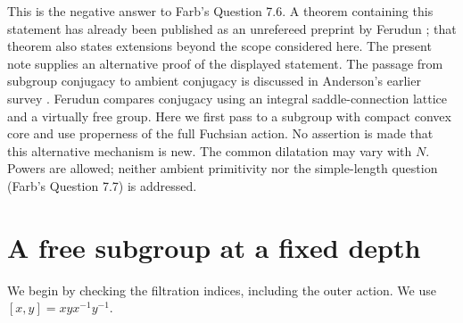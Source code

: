 \documentclass[11pt]{article}
\theoremstyle{remark}\newtheorem*{remark}{Remark}
\begin{document}
This is the negative answer to Farb's Question 7.6. A theorem containing
this statement has already been published as an unrefereed preprint by
Ferudun \cite[Theorem 1.1]{Ferudun}; that theorem also states extensions
beyond the scope considered here. The present note supplies an alternative
proof of the displayed statement. The passage from subgroup conjugacy to
ambient conjugacy is discussed in Anderson's earlier survey
\cite[\S5, author-hosted version]{Anderson}. Ferudun compares conjugacy using an
integral saddle-connection lattice and a virtually free group. Here we
first pass to a subgroup with compact convex core and use properness of
the full Fuchsian action. No assertion is made that this alternative
mechanism is new. The common dilatation may vary with $N$. Powers are
allowed; neither ambient primitivity nor the simple-length question
(Farb's Question 7.7) is addressed.

\section{A free subgroup at a fixed depth}
We begin by checking the filtration indices, including the outer action.
We use $[x,y]=xyx^{-1}y^{-1}$.
\end{document}
